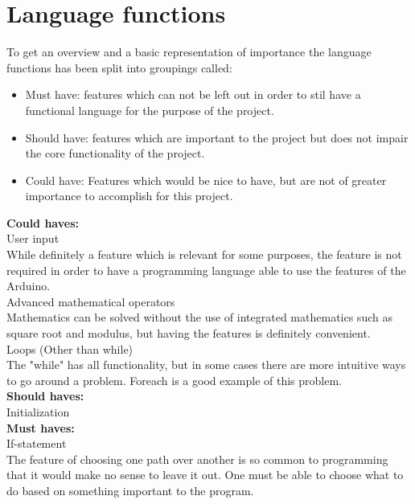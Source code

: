 \section{Language functions}
To get an overview and a basic representation of importance the language functions has been split into groupings called:
\begin{itemize}
\item Must have: features which can not be left out in order to stil have a functional language for the purpose of the project.
\item Should have: features which are important to the project but does not impair the core functionality of the project.
\item Could have: Features which would be nice to have, but are not of greater importance to accomplish for this project.
\end{itemize}

\textbf{Could haves:} \\

User input \\
While definitely a feature which is relevant for some purposes, the feature is not required in order to have a programming language able to use the features of the Arduino. \\

Advanced mathematical operators \\
Mathematics can be solved without the use of integrated mathematics such as square root and modulus, but having the features is definitely convenient. \\

Loops (Other than while) \\
The "while" has all functionality, but in some cases there are more intuitive ways to go around a problem. Foreach is a good example of this problem.\\

\textbf{Should haves:} \\

Initialization \\


\textbf{Must haves:} \\

If-statement \\
The feature of choosing one path over another is so common to programming that it would make no sense to leave it out. One must be able to choose what to do based on something important to the program. \\

